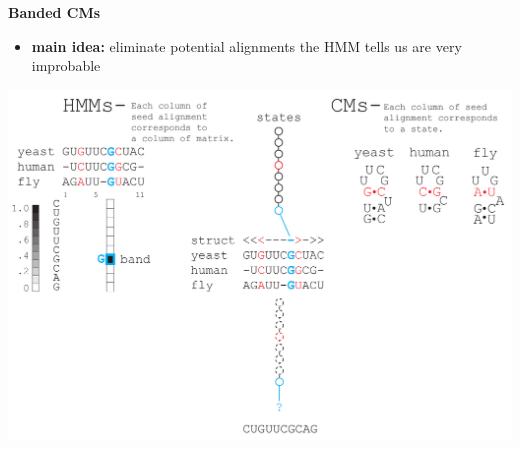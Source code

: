 \documentclass[landscape]{slides}
\begin{document}
\begin{slide}
\begin{center}
\large
\textbf{Banded CMs}
\end{center}
\medskip
\small
\begin{itemize}
\item
\textbf{main idea:} eliminate potential alignments the HMM tells us are very improbable
\end{itemize}
\begin{center}
\includegraphics[width=8in]{figs/post_hmm_to_cm_map2_layer12}
\end{center}
\vfill
\end{slide}
\end{document}
